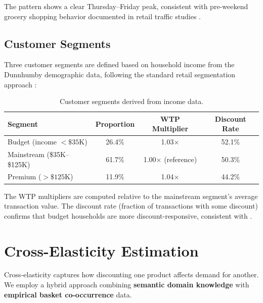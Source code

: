 \documentclass[11pt,a4paper]{article}
\begin{document}
The pattern shows a clear Thursday--Friday peak, consistent with pre-weekend grocery shopping behavior documented in retail traffic studies \citep{walters1988}.

\subsection{Customer Segments}

Three customer segments are defined based on household income from the Dunnhumby demographic data, following the standard retail segmentation approach \citep{blattberg1990}:

\begin{table}[H]
\centering
\caption{Customer segments derived from income data.}
\begin{tabular}{@{}lccc@{}}
\toprule
\textbf{Segment} & \textbf{Proportion} & \textbf{WTP Multiplier} & \textbf{Discount Rate} \\
\midrule
Budget (income $< \$35$K) & 26.4\% & 1.03$\times$ & 52.1\% \\
Mainstream (\$35K--\$125K) & 61.7\% & 1.00$\times$ (reference) & 50.3\% \\
Premium ($> \$125$K) & 11.9\% & 1.04$\times$ & 44.2\% \\
\bottomrule
\end{tabular}
\end{table}

The WTP multipliers are computed relative to the mainstream segment's average transaction value.
The discount rate (fraction of transactions with some discount) confirms that budget households are more discount-responsive, consistent with \citet{hoch1995}.

\section{Cross-Elasticity Estimation}
\label{sec:cross_elast}

Cross-elasticity captures how discounting one product affects demand for another.
We employ a hybrid approach combining \textbf{semantic domain knowledge} with \textbf{empirical basket co-occurrence} data.

\end{document}

